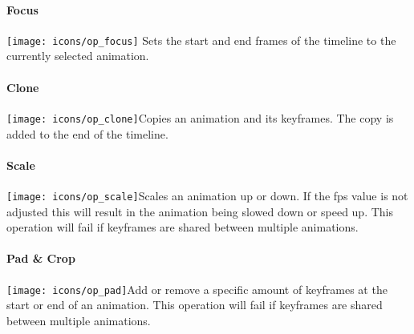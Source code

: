 \paragraph{Focus}{\texttt{[image: icons/op\_focus]}} Sets the start and end frames of the timeline to the currently selected animation.

\paragraph{Clone}{\texttt{[image: icons/op\_clone]}}Copies an animation and its keyframes. The copy is added to the end of the timeline.
    
\paragraph{Scale}{\texttt{[image: icons/op\_scale]}}Scales an animation up or down. If the fps value is not adjusted this will result in the animation being slowed down or speed up. This operation will fail if keyframes are shared between multiple animations.
    
\paragraph{Pad \& Crop}{\texttt{[image: icons/op\_pad]}}Add or remove a specific amount of keyframes at the start or end of an animation. This operation will fail if keyframes are shared between multiple animations.